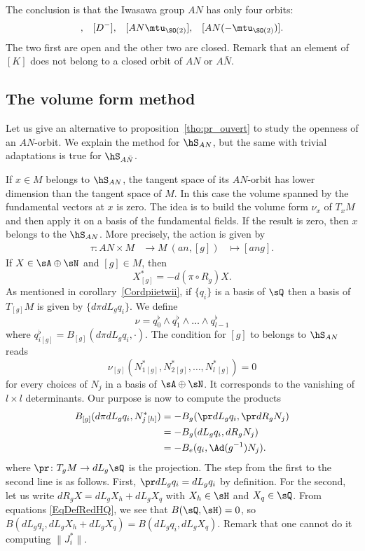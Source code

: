 The conclusion is that the Iwasawa group $AN$ has only four orbits:
\begin{align}
	[D^+], &  & [D^-], &  & [AN\mtu_{\SO(2)}], &  & [AN(-\mtu_{\SO(2)})].
\end{align}
The two first are open and the other two are closed. Remark\label{PgNoticeKpassung} that an element of $[K]$ does not belong to a closed orbit of $AN$ or $A\bar N$.


\subsection{The volume form method}    \label{subsecVolumeForm}

Let us give an alternative to proposition~\ref{tho:pr_ouvert} to study the openness of an $AN$-orbit. We explain the method for $\hS_{AN}$, but the same with trivial adaptations is true for $\hS_{A\bar{N}}$.

If $x\in M$ belongs to $\hS_{AN}$, the tangent space of its $AN$-orbit has lower dimension than the tangent space of $M$.  In this case the volume spanned by the fundamental vectors at $x$ is zero.  The idea is to build the volume form $\nu_x$ of $T_xM$ and then apply it on a basis of the fundamental fields.  If the result is zero, then $x$ belongs to the $\hS_{AN}$.  More precisely, the action is given by
\begin{equation}
	\begin{aligned}
		\tau \colon AN\times M & \to M\
		(an,[g])               & \mapsto [ang].
	\end{aligned}
\end{equation}
If $X\in\sA\oplus\sN$ and $[g]\in M$, then
\begin{equation}
	X^*_{[g]}=-d(\pi\circ R_g)X.
\end{equation}
As mentioned in corollary~\ref{Cordpiietwii}, if $\{q_i\}$ is a basis of $\sQ$ then a basis of $T_{[g]}M$ is given by $\{d\pi dL_gq_i\}$. We define
\[
	\nu=q_0^{\flat}\wedge q_1^{\flat}\wedge \ldots \wedge
	q_{l-1}^{\flat}
\]
where $q_{i[g]}^{\flat}=B_{[g]}(d\pi dL_g q_i,\cdot)$. The condition for $[g]$ to belongs to $\hS_{AN}$ reads
\begin{equation}\label{eq:nusurN}
	\nu_{[g]}(N_1^*{}_{[g]},N_2^*{}_{[g]},\ldots,N_l^*{}_{[g]})=0
\end{equation}
for every choices of $N_j$ in a basis of $\sA\oplus\sN$. It corresponds to the vanishing of $l \times l$ determinants. Our purpose is now to compute the products
\[
	\begin{split}
		B_{[g]}(d\pi dL_g q_i,N^*_j{}_{[h]})	&=-B_g(\pr dL_g q_i,\pr dR_g N_j)\\
		&=-B_g(dL_g q_i,dR_g N_j)\\
		&=-B_e(q_i,\Ad(g^{-1})N_j).
	\end{split}
\]
where $\pr\colon T_{g}M\to dL_{g}\sQ$ is the projection. The step from the first to the second line is as follows. First, $\pr dL_gq_i=dL_gq_i$ by definition. For the second, let us write $dR_g X=dL_g X_h+dL_g X_q$ with $X_h\in\sH$ and $X_q\in\sQ$. From equations \eqref{EqDefRedHQ}, we see that $B(\sQ,\sH)=0$, so $B(dL_g q_i,dL_g X_h+dL_g X_q)=B(dL_g q_i,dL_g X_q)$. Remark that one cannot do it computing $\|J_i^*\|$.


